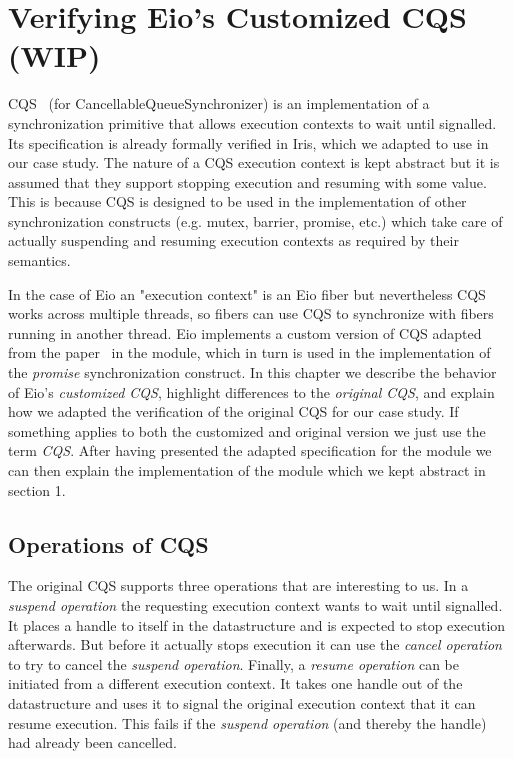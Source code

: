 \section{Verifying Eio's Customized CQS (WIP)}
\label{sec:cqs}


CQS~\cite{koval2023cqs} (for CancellableQueueSynchronizer) is an implementation of a synchronization primitive that allows execution contexts to wait until signalled.
Its specification is already formally verified in Iris, which we adapted to use in our case study.
The nature of a CQS execution context is kept abstract but it is assumed that they support stopping execution and resuming with some value.
This is because CQS is designed to be used in the implementation of other synchronization constructs (e.g. mutex, barrier, promise, etc.) which take care of actually suspending and resuming execution contexts as required by their semantics.


In the case of Eio an "execution context" is an Eio fiber but nevertheless CQS works across multiple threads, so fibers can use CQS to synchronize with fibers running in another thread.
Eio implements a custom version of CQS adapted from the paper~\cite{koval2023cqs} in the  module, which in turn is used in the implementation of the \textit{promise} synchronization construct.
In this chapter we describe the behavior of Eio's \textit{customized CQS}, highlight differences to the \textit{original CQS}, and explain how we adapted the verification of the original CQS for our case study.
If something applies to both the customized and original version we just use the term \textit{CQS}.
After having presented the adapted specification for the  module we can then explain the implementation of the  module which we kept abstract in section 1.

\subsection{Operations of CQS}
\label{sec:cqs-operations}

The original CQS supports three operations that are interesting to us.
In a \textit{suspend operation} the requesting execution context wants to wait until signalled.
It places a handle to itself in the datastructure and is expected to stop execution afterwards.
But before it actually stops execution it can use the \textit{cancel operation} to try to cancel the \textit{suspend operation}.
Finally, a \textit{resume operation} can be initiated from a different execution context.
It takes one handle out of the datastructure and uses it to signal the original execution context that it can resume execution.
This fails if the \textit{suspend operation} (and thereby the handle) had already been cancelled.

